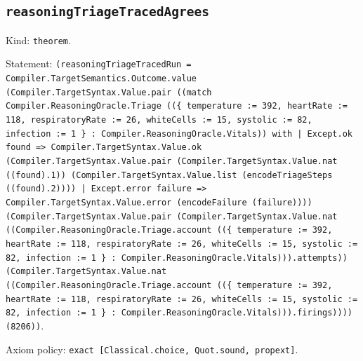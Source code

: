 \documentclass[11pt]{article}
\begin{document}
\subsection*{\texttt{reasoningTriageTracedAgrees}}
\noindent Kind: \texttt{theorem}.\par
\noindent Statement: \texttt{(reasoningTriageTracedRun = Compiler.TargetSemantics.Outcome.value (Compiler.TargetSyntax.Value.pair ((match Compiler.ReasoningOracle.Triage ((\{ temperature := 392, heartRate := 118, respiratoryRate := 26, whiteCells := 15, systolic := 82, infection := 1 \} : Compiler.ReasoningOracle.Vitals)) with | Except.ok found => Compiler.TargetSyntax.Value.ok (Compiler.TargetSyntax.Value.pair (Compiler.TargetSyntax.Value.nat ((found).1)) (Compiler.TargetSyntax.Value.list (encodeTriageSteps ((found).2)))) | Except.error failure => Compiler.TargetSyntax.Value.error (encodeFailure (failure)))) (Compiler.TargetSyntax.Value.pair (Compiler.TargetSyntax.Value.nat ((Compiler.ReasoningOracle.Triage.account ((\{ temperature := 392, heartRate := 118, respiratoryRate := 26, whiteCells := 15, systolic := 82, infection := 1 \} : Compiler.ReasoningOracle.Vitals))).attempts)) (Compiler.TargetSyntax.Value.nat ((Compiler.ReasoningOracle.Triage.account ((\{ temperature := 392, heartRate := 118, respiratoryRate := 26, whiteCells := 15, systolic := 82, infection := 1 \} : Compiler.ReasoningOracle.Vitals))).firings)))) (8206))}.\par
\noindent Axiom policy: \texttt{exact [Classical.choice, Quot.sound, propext]}.\par
\end{document}
